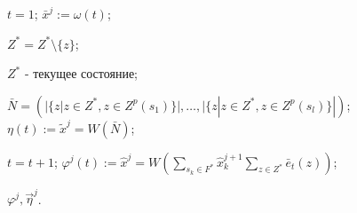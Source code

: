 	\Statex {}
	
	\State $t=1$;
	 \label{alst:cycle_start}
		\State $\bar x^j:=\omega(t)$;
	
			 \label{alst:update_z}
				\State $Z^*=Z^*\setminus\{z\}$;
			\EndIf
		\EndFor
	
		\State $Z^*$ - текущее состояние; 
		
		\State $\bar N=(|\{z|z\in Z^*,z\in Z^p(s_1)\}|,\dots,|\{z|z\in Z^*,z\in Z^p(s_l)\}|)$; \label{alst:calc_out1}
		\State $\eta(t):=\tilde x^j=W(\bar N)$; \label{alst:calc_out3}
	
		\State $t=t+1$;
			\State $\varphi^j(t):=\hat x^j=W(\sum_{s_k\in F^*}\hat x_k^{j+1}\sum_{z\in Z^*}\bar e_t(z))$; \label{alst:calc_state1}
		\EndIf
	\EndWhile \label{alst:cycle_end}
	
	\Return $\varphi^j,\vec\eta^j$.